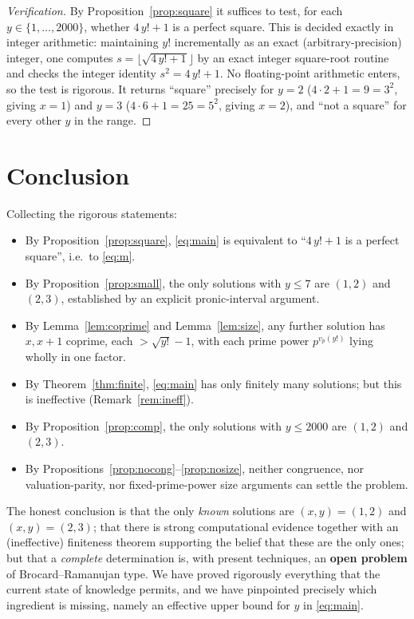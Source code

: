\documentclass{amsart}
\theoremstyle{plain}
\theoremstyle{remark}
\begin{document}
\begin{proof}[Verification]
By Proposition~\ref{prop:square} it suffices to test, for each
$y\in\{1,\dots,2000\}$, whether $4\,y!+1$ is a perfect square.  This is
decided exactly in integer arithmetic: maintaining $y!$ incrementally as an
exact (arbitrary-precision) integer, one computes $s=\lfloor\sqrt{4\,y!+1}
\rfloor$ by an exact integer square-root routine and checks the integer
identity $s^2=4\,y!+1$.  No floating-point arithmetic enters, so the test is
rigorous.  It returns ``square'' precisely for $y=2$
($4\cdot 2+1=9=3^2$, giving $x=1$) and $y=3$ ($4\cdot 6+1=25=5^2$, giving
$x=2$), and ``not a square'' for every other $y$ in the range.
\end{proof}

\section{Conclusion}

Collecting the rigorous statements:
\begin{itemize}
\item By Proposition~\ref{prop:square}, \eqref{eq:main} is equivalent to
``$4\,y!+1$ is a perfect square'', i.e.\ to \eqref{eq:m}.
\item By Proposition~\ref{prop:small}, the only solutions with $y\le 7$ are
$(1,2)$ and $(2,3)$, established by an explicit pronic-interval argument.
\item By Lemma~\ref{lem:coprime} and Lemma~\ref{lem:size}, any further
solution has $x,x+1$ coprime, each $>\sqrt{y!}-1$, with each prime power
$p^{v_p(y!)}$ lying wholly in one factor.
\item By Theorem~\ref{thm:finite}, \eqref{eq:main} has only finitely many
solutions; but this is ineffective (Remark~\ref{rem:ineff}).
\item By Proposition~\ref{prop:comp}, the only solutions with $y\le 2000$
are $(1,2)$ and $(2,3)$.
\item By Propositions~\ref{prop:nocong}--\ref{prop:nosize}, neither
congruence, nor valuation-parity, nor fixed-prime-power size arguments can
settle the problem.
\end{itemize}
The honest conclusion is that the only \emph{known} solutions are
$(x,y)=(1,2)$ and $(x,y)=(2,3)$; that there is strong computational evidence
together with an (ineffective) finiteness theorem supporting the belief that
these are the only ones; but that a \emph{complete} determination is, with
present techniques, an \textbf{open problem} of Brocard--Ramanujan type. We
have proved rigorously everything that the current state of knowledge
permits, and we have pinpointed precisely which ingredient is missing,
namely an effective upper bound for $y$ in \eqref{eq:main}.
\end{document}
